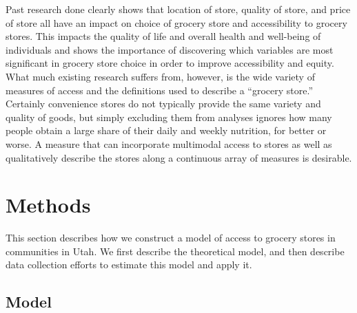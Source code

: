 \documentclass[
  letterpaper,
  authoryear,
  review,
  3p]{elsarticle}
\begin{document}
Past research done clearly shows that location of store, quality of
store, and price of store all have an impact on choice of grocery store
and accessibility to grocery stores. This impacts the quality of life
and overall health and well-being of individuals and shows the
importance of discovering which variables are most significant in
grocery store choice in order to improve accessibility and equity. What
much existing research suffers from, however, is the wide variety of
measures of access and the definitions used to describe a ``grocery
store.'' Certainly convenience stores do not typically provide the same
variety and quality of goods, but simply excluding them from analyses
ignores how many people obtain a large share of their daily and weekly
nutrition, for better or worse. A measure that can incorporate
multimodal access to stores as well as qualitatively describe the stores
along a continuous array of measures is desirable.


\hypertarget{sec-methods}{%
\section{Methods}\label{sec-methods}}

This section describes how we construct a model of access to grocery
stores in communities in Utah. We first describe the theoretical model,
and then describe data collection efforts to estimate this model and
apply it.

\hypertarget{model}{%
\subsection{Model}\label{model}}
\end{document}
